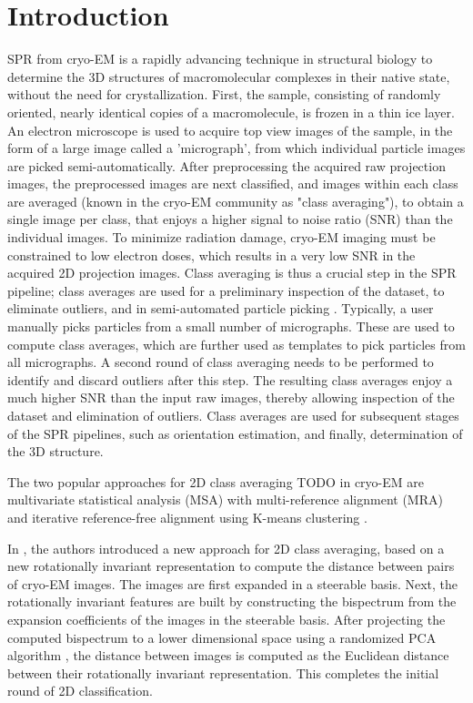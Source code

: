 \documentclass{article}
\begin{document}
\section{Introduction}
\label{sec:intro}
SPR from cryo-EM is a rapidly advancing technique in structural biology to determine
the 3D structures of macromolecular complexes in their native state,
 without the need for crystallization. First, the sample, consisting of randomly oriented, nearly identical copies of a macromolecule, is frozen in a thin ice layer. An electron microscope is used to acquire top view images of the sample, in the form of a large image called a 'micrograph', from which individual particle images are picked semi-automatically. After preprocessing the acquired raw projection images, the preprocessed images are next classified, and images within each class are averaged (known in the cryo-EM community as "class averaging"), to obtain a single image per class, that enjoys a higher signal to noise ratio (SNR) than the individual images. To minimize radiation damage, cryo-EM imaging must be constrained to low electron doses, which results in a very low SNR in the acquired 2D projection images. Class averaging is thus a crucial step in the SPR pipeline; class averages are used for a preliminary inspection of the dataset, to eliminate outliers, and in semi-automated particle picking \cite{relion}. Typically, a user manually picks particles from a small number of micrographs. These are used to compute class averages, which are further used as templates to pick particles from all micrographs. A second round of class averaging needs to be performed to identify and discard outliers after this step. The resulting class averages enjoy a much higher SNR than the input raw images, thereby allowing inspection of the dataset and elimination of outliers. Class averages are used for subsequent stages of the SPR pipelines, such as orientation estimation, and finally, determination of the 3D structure.
 
The two popular approaches for 2D class averaging \cite{} TODO in cryo-EM are multivariate statistical analysis (MSA)\cite{} with multi-reference alignment (MRA) \cite{} and iterative reference-free alignment using K-means clustering \cite{}.

In \cite{zhao}, the authors introduced a new approach for 2D class averaging, based on a new rotationally invariant representation to compute the distance between pairs of cryo-EM images. The images are first expanded in a steerable basis. Next, the rotationally invariant features are built by constructing the bispectrum from the expansion coefficients of the images in the steerable basis. After projecting the computed bispectrum to a lower dimensional space using a randomized PCA algorithm \cite{rokhlin}, the distance between images is computed as the Euclidean distance between their rotationally invariant representation. This completes the initial round of 2D classification. 
\end{document}
